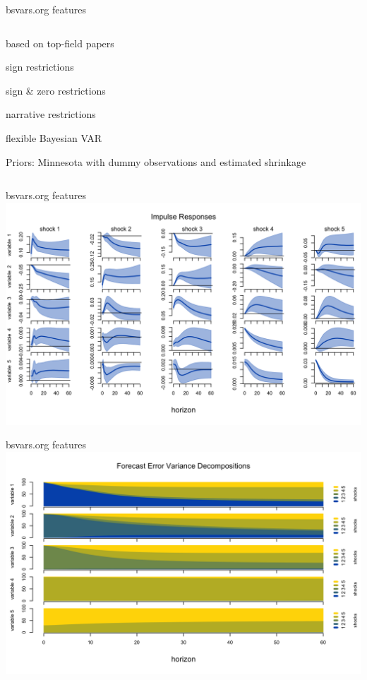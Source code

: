 \documentclass[aspectratio=1610,notes,blackandwhite,mathsans,usenames,dvipsnames]{beamer}
\begin{document}
\begin{frame}{\huge bsvars.org features}
\begin{columns}
\begin{column}{0.5\textwidth}
				\large
				\begin{itemize}[label=$\blacktriangleright$]
				{\color{lig}
					\item based on top-field papers\\ [1ex]
					\item sign restrictions\\ [1ex]
					\item sign \& zero restrictions\\[1ex]
					\item narrative restrictions\\[1ex]
					\item flexible Bayesian VAR\\[1ex]
					\item Priors: Minnesota with dummy observations and estimated shrinkage
				}	
				\end{itemize}
			\end{column}
		\end{columns}
	\end{frame}
	
	
	
	
	
	
	\begin{frame}{\huge bsvars.org features}
		\centering
		\includegraphics[scale=0.25]{bs_irf}
	\end{frame}
	
	
	
	\begin{frame}{\huge bsvars.org features}
		\centering
		\includegraphics[scale=0.25]{bs_fevd}
	\end{frame}
	
\end{document}

